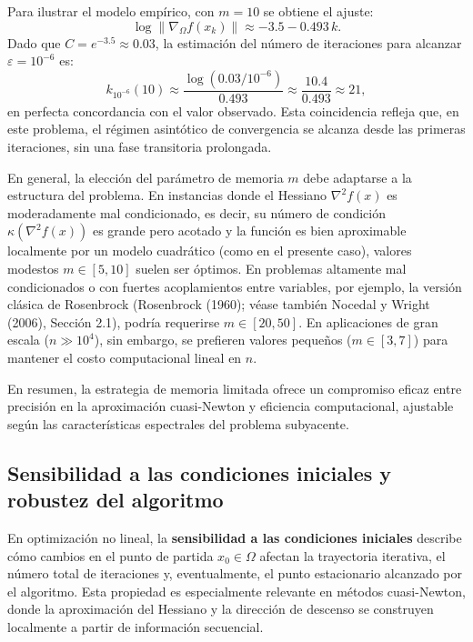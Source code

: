 \documentclass[
  spanish,
  us-letterpaper,
]{scrreprt}
\numberwithin{equation}{section}
\begin{document}
Para ilustrar el modelo empírico, con \(m = 10\) se obtiene el ajuste:
\[
\log \|\nabla_\Omega f(x_k)\| \approx -3.5 - 0.493\, k.
\] Dado que \(C = e^{-3.5} \approx 0.03\), la estimación del número de
iteraciones para alcanzar \(\varepsilon = 10^{-6}\) es: \[
k_{10^{-6}}(10) \approx \frac{\log(0.03 / 10^{-6})}{0.493} \approx \frac{10.4}{0.493} \approx 21,
\] en perfecta concordancia con el valor observado. Esta coincidencia
refleja que, en este problema, el régimen asintótico de convergencia se
alcanza desde las primeras iteraciones, sin una fase transitoria
prolongada.

En general, la elección del parámetro de memoria \(m\) debe adaptarse a
la estructura del problema. En instancias donde el Hessiano
\(\nabla^2 f(x)\) es moderadamente mal condicionado, es decir, su número
de condición \(\kappa(\nabla^2 f(x))\) es grande pero acotado y la
función es bien aproximable localmente por un modelo cuadrático (como en
el presente caso), valores modestos \(m \in [5,10]\) suelen ser óptimos.
En problemas altamente mal condicionados o con fuertes acoplamientos
entre variables, por ejemplo, la versión clásica de Rosenbrock
(Rosenbrock (1960); véase también Nocedal y Wright (2006), Sección 2.1),
podría requerirse \(m \in [20,50]\). En aplicaciones de gran escala
(\(n \gg 10^4\)), sin embargo, se prefieren valores pequeños
(\(m \in [3,7]\)) para mantener el costo computacional lineal en \(n\).

En resumen, la estrategia de memoria limitada ofrece un compromiso
eficaz entre precisión en la aproximación cuasi-Newton y eficiencia
computacional, ajustable según las características espectrales del
problema subyacente.

\subsection{Sensibilidad a las condiciones iniciales y robustez del
algoritmo}\label{sensibilidad-a-las-condiciones-iniciales-y-robustez-del-algoritmo}

En optimización no lineal, la \textbf{sensibilidad a las condiciones
iniciales} describe cómo cambios en el punto de partida
\(x_0 \in \Omega\) afectan la trayectoria iterativa, el número total de
iteraciones y, eventualmente, el punto estacionario alcanzado por el
algoritmo. Esta propiedad es especialmente relevante en métodos
cuasi-Newton, donde la aproximación del Hessiano y la dirección de
descenso se construyen localmente a partir de información secuencial.
\end{document}

